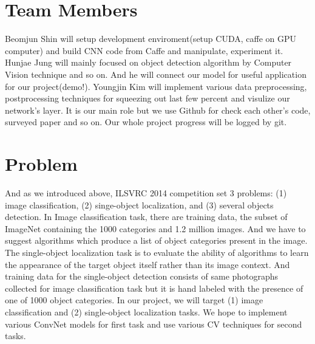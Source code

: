 \documentclass[10pt,twocolumn,letterpaper]{article}
\begin{document}
\section{Team Members}

Beomjun Shin will setup development enviroment(setup CUDA, caffe on GPU computer) and build CNN code from Caffe and manipulate, experiment it.
Hunjae Jung will mainly focused on object detection algorithm by Computer Vision technique and so on.
And he will connect our model for useful application for our project(demo!).
Youngjin Kim will implement various data preprocessing, postprocessing techniques for squeezing out last few percent and visulize our network's layer.
It is our main role but we use Github for check each other's code, surveyed paper and so on.
Our whole project progress will be logged by git.

\section{Problem}

And as we introduced above, ILSVRC 2014 competition set 3 problems: (1) image classification, (2) singe-object localization, and (3) several objects detection.
In Image classification task, there are training data, the subset of ImageNet containing the 1000 categories and 1.2 million images.
And we have to suggest algorithms which produce a list of object categories present in the image.
The single-object localization task is to evaluate the ability of algorithms to learn the appearance of the target object itself rather than its image context.
And training data for the single-object detection consists of same photographs collected for image classification task but it is hand labeled with the presence of one of 1000 object categories.
In our project, we will target (1) image classification and (2) single-object localization tasks.
We hope to implement various ConvNet models for first task and use various CV techniques for second tasks.
\end{document}
